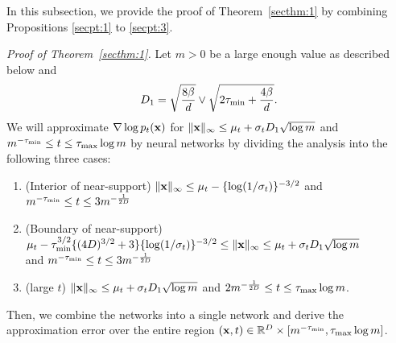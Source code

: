 \documentclass[twoside,11pt]{article}
\newcommand{\bx}{{\bf x}}
\newcommand{\bbR}{{\mathbb R}}
\newcommand{\bean}{\setlength\arraycolsep{1pt}\begin{eqnarray*}}
\newcommand{\eean}{\end{eqnarray*}}
\newcommand{\ben}{\begin{enumerate}}
\newcommand{\een}{\end{enumerate}}
\begin{document}
In this subsection, we provide the proof of Theorem~\ref{secthm:1} by combining  Propositions \ref{secpt:1} to \ref{secpt:3}.

\textit{Proof of Theorem~\ref{secthm:1}.}
Let $m > 0$ be a large enough value as described below and 
\bean
D_{1} =\sqrt{ \frac{ 8\beta}{d} }  \vee \sqrt{2\tau_{\rm min} + \frac{ 4\beta }{d}}.
\eean
We will approximate $\nabla \log p_t(\bx)$ for $\|\bx\|_{\infty} \leq  \mu_t + \sigma_t D_{1} \sqrt{\log m}$ and $m^{-\tau_{\rm min}} \leq t \leq \tau_{\rm max} \log m$ by neural networks by dividing the analysis into  the following three cases:
\ben
\item (Interior of near-support) $\|\bx\|_{\infty} \leq \mu_t- \{ \log (1/\sigma_t)\}^{-3/2}$ and $m^{-\tau_{\rm min}} \leq t \leq  3m^{-\frac{1}{2D}}$
\item (Boundary of near-support) $\mu_t-  \tau_{\rm min}^{3/2} \{    (4D)^{3/2} +3  \} \{ \log (1/\sigma_t)\}^{-3/2} \leq  \|\bx\|_{\infty} \leq \mu_t + \sigma_t D_{1} \sqrt{\log m}$ 
\\
and $m^{-\tau_{\rm min}} \leq  t \leq 3m^{-\frac{1}{2D}}$
\item (large $t$) $\|\bx\|_{\infty} \leq  \mu_t + \sigma_t D_{1} \sqrt{\log m}$ and $2 m^{-\frac{1}{2D}} \leq t \leq \tau_{\rm max}  \log m$.
\een
Then, we combine the networks into a single network and derive the approximation error over the entire region $(\bx,t) \in \bbR^{D} \times  [m^{-\tau_{\rm min}},\tau_{\rm max} \log m]$.

\end{document}
